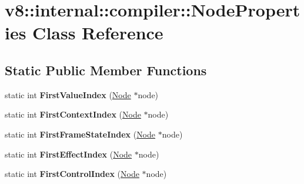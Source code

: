 \hypertarget{classv8_1_1internal_1_1compiler_1_1_node_properties}{}\section{v8\+:\+:internal\+:\+:compiler\+:\+:Node\+Properties Class Reference}
\label{classv8_1_1internal_1_1compiler_1_1_node_properties}
\subsection*{Static Public Member Functions}
\begin{DoxyCompactItemize}
\item 
static int {\bfseries First\+Value\+Index} (\hyperlink{classv8_1_1internal_1_1compiler_1_1_node}{Node} $\ast$node)\hypertarget{classv8_1_1internal_1_1compiler_1_1_node_properties_a803b42b8d797f470b4748f7d52e867e4}{}\label{classv8_1_1internal_1_1compiler_1_1_node_properties_a803b42b8d797f470b4748f7d52e867e4}

\item 
static int {\bfseries First\+Context\+Index} (\hyperlink{classv8_1_1internal_1_1compiler_1_1_node}{Node} $\ast$node)\hypertarget{classv8_1_1internal_1_1compiler_1_1_node_properties_a5246dde8adecffdcf5e97dea4d00d284}{}\label{classv8_1_1internal_1_1compiler_1_1_node_properties_a5246dde8adecffdcf5e97dea4d00d284}

\item 
static int {\bfseries First\+Frame\+State\+Index} (\hyperlink{classv8_1_1internal_1_1compiler_1_1_node}{Node} $\ast$node)\hypertarget{classv8_1_1internal_1_1compiler_1_1_node_properties_a50c54cfb3419a1a52796e6d50013a191}{}\label{classv8_1_1internal_1_1compiler_1_1_node_properties_a50c54cfb3419a1a52796e6d50013a191}

\item 
static int {\bfseries First\+Effect\+Index} (\hyperlink{classv8_1_1internal_1_1compiler_1_1_node}{Node} $\ast$node)\hypertarget{classv8_1_1internal_1_1compiler_1_1_node_properties_a06e3ffb035363dac35a6bfc1b65dddf0}{}\label{classv8_1_1internal_1_1compiler_1_1_node_properties_a06e3ffb035363dac35a6bfc1b65dddf0}

\item 
static int {\bfseries First\+Control\+Index} (\hyperlink{classv8_1_1internal_1_1compiler_1_1_node}{Node} $\ast$node)\hypertarget{classv8_1_1internal_1_1compiler_1_1_node_properties_abc48e101c346205be71e188f97fbd3eb}{}\label{classv8_1_1internal_1_1compiler_1_1_node_properties_abc48e101c346205be71e188f97fbd3eb}


\end{DoxyCompactItemize}
